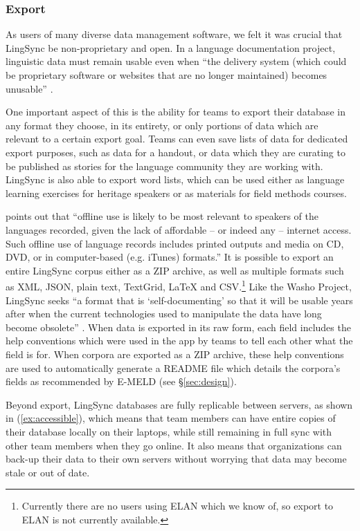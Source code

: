 \documentclass[letterpaper, 12pt, dvips]{mitwpl}
\begin{document}
\subsubsection{Export}

As users of many diverse data management software,
we felt it was crucial that LingSync be non-proprietary and open. In a language documentation project,  linguistic data must remain usable even when ``the delivery system (which could be proprietary software or websites that are no longer maintained) becomes unusable'' \citep[p.132]{Thieberger:2012}.

One important aspect of this is the ability for teams to export their database in any format they choose,
in its entirety, or only portions of data which are relevant to a certain export goal.
Teams can even save lists of data for dedicated export purposes,
such as data for a handout,
or data which they are curating to be published as stories for the language community they are working with.
LingSync is also able to export word lists,
which can be used either as language learning exercises for heritage speakers or as materials for field methods courses.

\cite{Thieberger:2012} points out that ``offline use is likely to be most relevant to speakers of the languages recorded, given the lack of affordable -- or indeed any -- internet access. Such offline use of language records includes printed outputs and media on CD, DVD, or in computer-based (e.g. iTunes) formats.'' 
It is possible to export an entire LingSync corpus either as a ZIP archive,
as well as multiple formats such as XML, JSON, plain text, TextGrid, LaTeX  and CSV.\footnote{Currently there are no users using ELAN which we know of, so export to ELAN is not currently available.} Like the Washo Project, LingSync seeks ``a format that is `self-documenting' so that it will be usable years after when the current technologies used to manipulate the data have long become obsolete'' \citep[p.4]{Cihlar:2008}. When data is exported in its raw form, each field includes the help conventions which were used in the app by teams to tell each other what the field is for. When corpora are exported as a ZIP archive, these help conventions are used to automatically generate a README file which details the corpora's fields as recommended by E-MELD (see \S \ref{sec:design}).

Beyond export,
LingSync databases are fully replicable between servers, as shown in (\ref{ex:accessible}),
which means that team members can have entire copies of their database locally on their laptops,
while still remaining in full sync with other team members when they go online.
It also means that organizations can back-up their data to their own servers without worrying that data may become stale or out of date.
\end{document}
